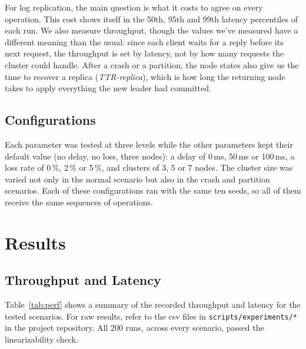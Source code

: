 \documentclass[conference]{IEEEtran}
\begin{document}
For log replication, the main question is what it costs to agree on every operation. This cost shows itself in the 50th, 95th and 99th latency percentiles of each run.
We also measure throughput, though the values we've measured have a different meaning than the usual: since each client waits for a reply before its next request,
the throughput is set by latency, not by how many requests the cluster could handle. After a crash or a partition, the node states also give us the time to recover a replica
(\emph{TTR-replica}), which is how long the returning node takes to apply everything the new leader had committed.

\subsection{Configurations}\label{sec:method-config}
Each parameter was tested at three levels while the other parameters kept their default value (no delay, no loss, three nodes): a delay of 0\,ms, 50\,ms or 100\,ms, a loss rate of 0\,\%, 2\,\% or 5\,\%, and clusters of 3, 5 or 7 nodes. The cluster size was varied not only in the normal scenario but also in the crash and partition scenarios. Each of these configurations ran with the same ten seeds, so all of them receive the same sequences of operations.

\section{Results}\label{sec:results}
\subsection{Throughput and Latency}

Table~\ref{tab:perf} shows a summary of the recorded throughput and latency for the tested scenarios. For raw results,
refer to the csv files in \texttt{scripts/experiments/*} in the project repository. All 200 runs, across every scenario, passed the linearizability check.
\end{document}
